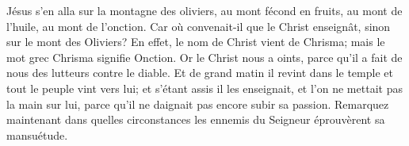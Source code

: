 Jésus s’en alla sur la montagne des oliviers,
	au mont fécond en fruits, au mont de l’huile, au mont de l’onction.
Car où convenait-il que le Christ enseignât, sinon sur le mont des Oliviers?
En effet, le nom de Christ vient de Chrisma;
	mais le mot grec Chrisma signifie Onction.
Or le Christ nous a oints,
	parce qu’il a fait de nous des lutteurs contre le diable.
Et de grand matin il revint dans le temple et tout le peuple vint vers lui;
	et s’étant assis il les enseignait, et l’on ne mettait pas la main sur lui,
	parce qu’il ne daignait pas encore subir sa passion.
Remarquez maintenant dans quelles circonstances
	les ennemis du Seigneur éprouvèrent sa mansuétude.
